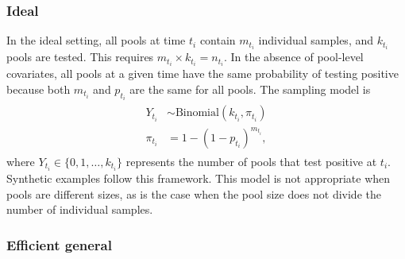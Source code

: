 \documentclass{article}
\begin{document}
\subsubsection{Ideal}

In the ideal setting, all pools at time $t_i$ contain $m_{t_i}$ individual samples, and $k_{t_i}$ pools are tested. This requires $m_{t_i}\times k_{t_i} = n_{t_i}$. In the absence of pool-level covariates, all pools at a given time have the same probability of testing positive because both $m_{t_i}$ and $p_{t_i}$ are the same for all pools. The sampling model is 
\begin{align}
    \begin{split}
        Y_{t_i}&\sim \text{Binomial}(k_{t_i}, \pi_{t_i})\\
        \pi_{t_i} &= 1- (1-p_{t_i})^{m_{t_i}},
    \end{split}
\end{align}
where $Y_{t_i}\in\{0,1,\dots,k_{t_i}\}$ represents the number of pools that test positive at $t_i$. Synthetic examples follow this framework. This model is not appropriate when pools are different sizes, as is the case when the pool size does not divide the number of individual samples. 

\subsubsection{Efficient general}
\end{document}
